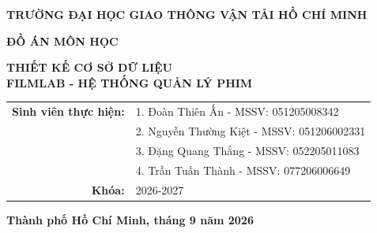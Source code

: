 
\begin{titlepage}
    \begin{center}
        \vspace*{1cm}
        
        {\large \textbf{TRƯỜNG ĐẠI HỌC GIAO THÔNG VẬN TẢI HỒ CHÍ MINH}}\\
        
        
        \vspace{2.5cm}
        
      
        
        \vspace{1.5cm}
        
        {\Large \textbf{ĐỒ ÁN MÔN HỌC}}\\
        
        \vspace{1.5cm}
        
        {\LARGE \textbf{THIẾT KẾ CƠ SỞ DỮ LIỆU}}\\
        {\LARGE \textbf{FILMLAB - HỆ THỐNG QUẢN LÝ PHIM}}\\
        
        \vspace{2cm}
        
        \begin{tabular}{rl}
            
            \textbf{Sinh viên thực hiện:}    & 1. Đoàn Thiên Ấn - MSSV: 051205008342 \\
                                             & 2. Nguyễn Thường Kiệt - MSSV: 051206002331 \\
                                             & 3. Đặng Quang Thắng - MSSV: 052205011083 \\
                                             & 4. Trần Tuấn Thành - MSSV: 077206006649 \\    
            \textbf{Khóa:}                   & 2026-2027 \\
        \end{tabular}
        
        \vspace{2cm}
        
        {\large \textbf{Thành phố Hồ Chí Minh, tháng 9 năm 2026}}
        
    \end{center}
\end{titlepage}